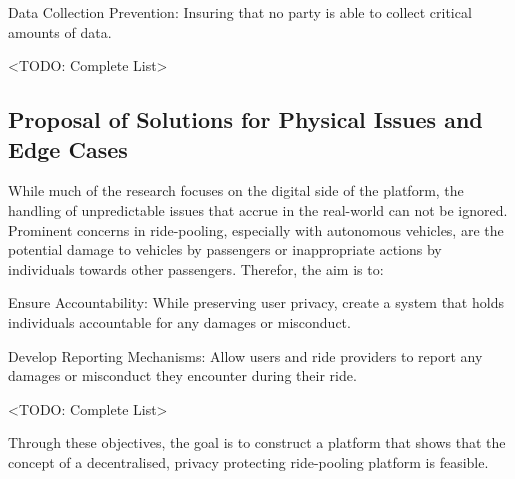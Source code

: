 Data Collection Prevention: Insuring that no party is able to collect critical amounts of data.

<TODO: Complete List>

\subsection{Proposal of Solutions for Physical Issues and Edge Cases}

While much of the research focuses on the digital side of the platform, the handling of unpredictable issues that accrue in the real-world can not be ignored. Prominent concerns in ride-pooling, especially with autonomous vehicles, are the potential damage to vehicles by passengers or inappropriate actions by individuals towards other passengers. Therefor, the aim is to:

Ensure Accountability: While preserving user privacy, create a system that holds individuals accountable for any damages or misconduct.

Develop Reporting Mechanisms: Allow users and ride providers to report any damages or misconduct they encounter during their ride.

<TODO: Complete List>

 Through these objectives, the goal is to construct a platform that shows that the concept of a decentralised, privacy protecting ride-pooling platform is feasible.